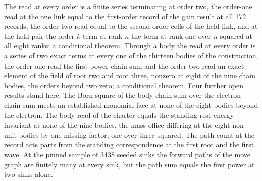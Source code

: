 The read at every order is a finite series terminating at order two, the order-one read at the one link equal to the first-order record of the gain result at all 172 records, the order-two read equal to the second-order cells of the held link, and at the held pair the order-$k$ term at rank $n$ the term at rank one over $n$ squared at all eight ranks; a conditional theorem.
Through a body the read at every order is a series of two exact terms at every one of the thirteen bodies of the construction, the order-one read the first-power chain sum and the order-two read an exact element of the field of root two and root three, nonzero at eight of the nine chain bodies, the orders beyond two zero; a conditional theorem.
Four further open results stand here. The Born square of the body chain sum over the electron chain sum meets an established monomial face at none of the eight bodies beyond the electron. The body read of the charter equals the standing rest-energy invariant at none of the nine bodies, the mass office differing at the eight non-unit bodies by one missing factor, one over three squared. The path count at the record acts parts from the standing correspondence at the first root and the first wave. At the pinned sample of 3438 seeded sinks the forward paths of the move graph are finitely many at every sink, but the path sum equals the first power at two sinks alone.
